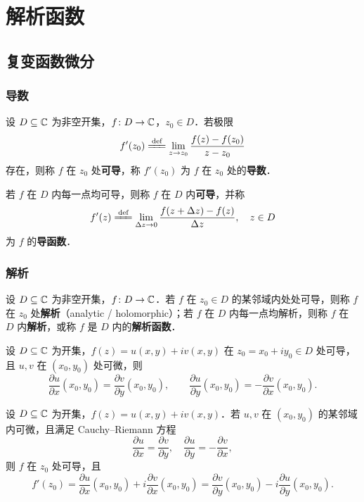\documentclass[12pt, a4paper, oneside, UTF8]{ctexbook}
\begin{document}
%
\else
\fi
\chapter{解析函数}
\section{复变函数微分}

\subsection{导数}
\begin{definition}[导数]
设 $D\subseteq\mathbb{C}$ 为非空开集，$f\colon D\to\mathbb{C}$，$z_0\in D$．若极限
\[
f'(z_0)\defeq\lim_{z\to z_0}\frac{f(z)-f(z_0)}{z-z_0}
\]
存在，则称 $f$ 在 $z_0$ 处\textbf{可导}，称 $f'(z_0)$ 为 $f$ 在 $z_0$ 处的\textbf{导数}．
\end{definition}

\begin{definition}[导函数]
若 $f$ 在 $D$ 内每一点均可导，则称 $f$ 在 $D$ 内\textbf{可导}，并称
\[
f'(z) \defeq \lim_{\Delta z\to 0}\frac{f(z+\Delta z)-f(z)}{\Delta z},\quad z\in D
\]
为 $f$ 的\textbf{导函数}．
\end{definition}

\subsection{解析}
\begin{definition}[解析]
设 $D\subseteq\mathbb{C}$ 为非空开集，$f\colon D\to\mathbb{C}$．若 $f$ 在 $z_0\in D$ 的某邻域内处处可导，则称 $f$ 在 $z_0$ 处\textbf{解析}（analytic / holomorphic）；若 $f$ 在 $D$ 内每一点均解析，则称 $f$ 在 $D$ 内\textbf{解析}，或称 $f$ 是 $D$ 内的\textbf{解析函数}．
\end{definition}

\begin{theorem}
设 $D\subseteq\mathbb{C}$ 为开集，$f(z)=u(x,y)+iv(x,y)$ 在 $z_0=x_0+iy_0\in D$ 处可导，且 $u,v$ 在 $(x_0,y_0)$ 处可微，则
\[
\frac{\partial u}{\partial x}(x_0,y_0) = \frac{\partial v}{\partial y}(x_0,y_0),\qquad
\frac{\partial u}{\partial y}(x_0,y_0) = -\frac{\partial v}{\partial x}(x_0,y_0).
\]
\end{theorem}

\begin{theorem}
设 $D\subseteq\mathbb{C}$ 为开集，$f(z)=u(x,y)+iv(x,y)$．若 $u,v$ 在 $(x_0,y_0)$ 的某邻域内可微，且满足 Cauchy--Riemann 方程
\[
\frac{\partial u}{\partial x} = \frac{\partial v}{\partial y},\quad \frac{\partial u}{\partial y} = -\frac{\partial v}{\partial x},
\]
则 $f$ 在 $z_0$ 处可导，且
\[
f'(z_0) = \frac{\partial u}{\partial x}(x_0,y_0) + i\frac{\partial v}{\partial x}(x_0,y_0)
= \frac{\partial v}{\partial y}(x_0,y_0) - i\frac{\partial u}{\partial y}(x_0,y_0).
\]
\end{theorem}
\end{document}
